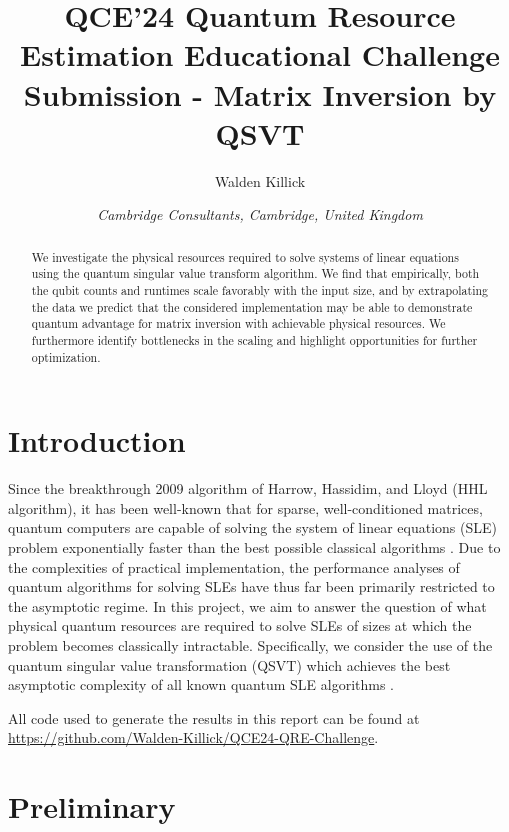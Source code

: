\documentclass[10pt, twocolumn]{article}
\begin{document}
\title{QCE'24 Quantum Resource Estimation Educational Challenge Submission - Matrix Inversion by QSVT}
\author{Walden Killick}
\date{\textit{Cambridge Consultants, Cambridge, United Kingdom}}

\maketitle

\begin{abstract}
	We investigate the physical resources required to solve systems of linear equations using the quantum singular value transform algorithm. We find that empirically, both the qubit counts and runtimes scale favorably with the input size, and by extrapolating the data we predict that the considered implementation may be able to demonstrate quantum advantage for matrix inversion with achievable physical resources. We furthermore identify bottlenecks in the scaling and highlight opportunities for further optimization.
\end{abstract}

\section{Introduction}

Since the breakthrough 2009 algorithm of Harrow, Hassidim, and Lloyd (HHL algorithm), it has been well-known that for sparse, well-conditioned matrices, quantum computers are capable of solving the system of linear equations (SLE) problem exponentially faster than the best possible classical algorithms \cite{harrow2009quantum}. Due to the complexities of practical implementation, the performance analyses of quantum algorithms for solving SLEs have thus far been primarily restricted to the asymptotic regime. In this project, we aim to answer the question of what physical quantum resources are required to solve SLEs of sizes at which the problem becomes classically intractable. Specifically, we consider the use of the quantum singular value transformation (QSVT) which achieves the best asymptotic complexity of all known quantum SLE algorithms \cite{gilyen2019quantum, martyn2021grand}.

All code used to generate the results in this report can  be found at \href{https://github.com/Walden-Killick/QCE24-QRE-Challenge}{https://github.com/Walden-Killick/QCE24-QRE-Challenge}.

\section{Preliminary}
\end{document}
